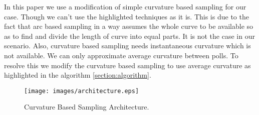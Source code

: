 
In this paper we use a modification of simple curvature based sampling for our case. 
Though we can't use the highlighted techniques as it is.
This is due to the fact that arc based sampling in a way assumes the whole curve to be available so as to find and divide the length of curve into equal parts.
It is not the case in our scenario. Also, curvature based sampling needs instantaneous curvature which is not available.
We can only approximate average curvature between polls.
To resolve this we modify the curvature based sampling to use average curvature as highlighted in the algorithm \ref{section:algorithm}.


\begin{figure}[ht]
\texttt{[image: images/architecture.eps]}

\caption{Curvature Based Sampling Architecture.}
\label{fig:Curvature Based Sampling_arch}
\end{figure}
